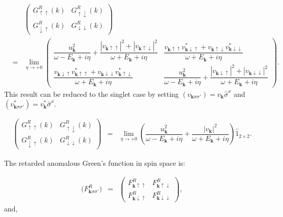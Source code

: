 \documentclass[uplatex,a4j,12pt,dvipdfmx]{jsarticle}
\begin{document}
\begin{eqnarray}
	&&
	\left(
	\begin{array}{cc}
			G_{\uparrow \uparrow}^{R}(k)   & G_{\uparrow \downarrow}^{R}(k)   \\[3mm]
			G_{\downarrow \uparrow}^{R}(k) & G_{\downarrow \downarrow}^{R}(k)
		\end{array}
	\right)
	\nonumber \\[4mm] &=&
	\lim_{\eta \to +0}
	\left(
	\begin{array}{cc}
			\dfrac{
				u_{\bm{k}}^{2}
			}{ \omega - E_{\bm{k}} + i \eta }
			+
			\dfrac{
				|v_{\bm{k} \uparrow \uparrow}|^{2}
				+
				|v_{\bm{k} \uparrow \downarrow}|^{2}
			}{ \omega + E_{\bm{k}} + i \eta }
			 &
			\dfrac{
				v_{\bm{k} \uparrow \uparrow}
				v_{\bm{k} \downarrow \uparrow}^{*}
				+
				v_{\bm{k} \uparrow \downarrow}
				v_{\bm{k} \downarrow \downarrow}^{*}
			}{ \omega + E_{\bm{k}} + i \eta }
			\\[3mm]
			\dfrac{
				v_{\bm{k} \downarrow \uparrow}
				v_{\bm{k} \uparrow \uparrow}^{*}
				+
				v_{\bm{k} \downarrow \downarrow}
				v_{\bm{k} \uparrow \downarrow}^{*}
			}{ \omega + E_{\bm{k}} + i \eta }
			 &
			\dfrac{
				u_{\bm{k}}^{2}
			}{ \omega - E_{\bm{k}} + i \eta }
			+
			\dfrac{
				|v_{\bm{k} \downarrow \uparrow}|^{2}
				+
				|v_{\bm{k} \downarrow \downarrow}|^{2}
			}{ \omega + E_{\bm{k}} + i \eta }
		\end{array}
	\right)
	.
\end{eqnarray}
%
This result can be reduced to the singlet case by setting $(v_{\bm{k} \sigma \sigma'}) = v_{\bm{k}} \hat{\sigma}^{x}$
and
$(v_{\bm{k} \sigma \sigma'}^{*}) = v_{\bm{k}}^{*} \hat{\sigma}^{x}$.

\begin{eqnarray}
	\left(
	\begin{array}{cc}
			G_{\uparrow \uparrow}^{R}(k)   & G_{\uparrow \downarrow}^{R}(k)   \\[3mm]
			G_{\downarrow \uparrow}^{R}(k) & G_{\downarrow \downarrow}^{R}(k)
		\end{array}
	\right)
	&=&
	\lim_{\eta \to +0}
	\left(
	\dfrac{
		u_{\bm{k}}^{2}
	}{ \omega - E_{\bm{k}} + i \eta }
	+
	\dfrac{ |v_{ \bm{k} }|^{2} }{ \omega + E_{\bm{k}} + i \eta }
	\right)
	\hat{1}_{2 \times 2}
	.
\end{eqnarray}
%


The retarded anomalous Green's function in spin space is:

\begin{eqnarray}
	\Big(
	F_{\bm{k} \sigma \sigma'}^{R}
	\Big)
	&=&
	\left(
	\begin{array}{cc}
			F_{\bm{k} \uparrow \uparrow}^{R}   & F_{\bm{k} \uparrow \downarrow}^{R}   \\[3mm]
			F_{\bm{k} \downarrow \uparrow}^{R} & F_{\bm{k} \downarrow \downarrow}^{R}
		\end{array}
	\right)
	,
\end{eqnarray}
%
and,
\end{document}
